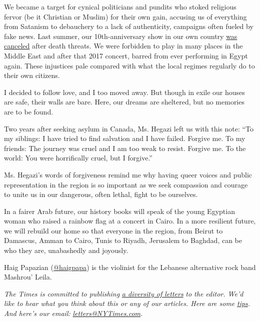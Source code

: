 We became a target for cynical politicians and pundits who stoked
religious fervor (be it Christian or Muslim) for their own gain,
accusing us of everything from Satanism to debauchery to a lack of
authenticity, campaigns often fueled by fake news. Last summer, our
10th-anniversary show in our own country
\href{https://www.nytimes3xbfgragh.onion/2019/07/31/world/middleeast/lebanon-mashrou-leila-blasphemy.html\#:~:text=Lebanese\%20Band's\%20Concert\%20Is\%20Canceled\%20After\%20It's\%20Accused\%20of\%20Blasphemy,-Mashrou'\%20Leila\%20has\&text=A\%20Lebanese\%20music\%20festival\%20has,Madonna\%20as\%20the\%20Virgin\%20Mary.}{was
canceled} after death threats. We were forbidden to play in many places
in the Middle East and after that 2017 concert, barred from ever
performing in Egypt again. These injustices pale compared with what the
local regimes regularly do to their own citizens.

I decided to follow love, and I too moved away. But though in exile our
houses are safe, their walls are bare. Here, our dreams are sheltered,
but no memories are to be found.

Two years after seeking asylum in Canada, Ms. Hegazi left us with this
note: ``To my siblings: I have tried to find salvation and I have
failed. Forgive me. To my friends: The journey was cruel and I am too
weak to resist. Forgive me. To the world: You were horrifically cruel,
but I forgive.''

Ms. Hegazi's words of forgiveness remind me why having queer voices and
public representation in the region is so important as we seek
compassion and courage to unite us in our dangerous, often lethal, fight
to be ourselves.

In a fairer Arab future, our history books will speak of the young
Egyptian woman who raised a rainbow flag at a concert in Cairo. In a
more resilient future, we will rebuild our home so that everyone in the
region, from Beirut to Damascus, Amman to Cairo, Tunis to Riyadh,
Jerusalem to Baghdad, can be who they are, unabashedly and joyously.

Haig Papazian
(\href{https://www.instagram.com/haigpapa/?hl=en}{@haigpapa}) is the
violinist for the Lebanese alternative rock band Mashrou' Leila.

\emph{The Times is committed to publishing}
\href{https://www.nytimes3xbfgragh.onion/2019/01/31/opinion/letters/letters-to-editor-new-york-times-women.html}{\emph{a
diversity of letters}} \emph{to the editor. We'd like to hear what you
think about this or any of our articles. Here are some}
\href{https://help.nytimes3xbfgragh.onion/hc/en-us/articles/115014925288-How-to-submit-a-letter-to-the-editor}{\emph{tips}}\emph{.
And here's our email:}
\href{mailto:letters@NYTimes.com}{\emph{letters@NYTimes.com}}\emph{.}

